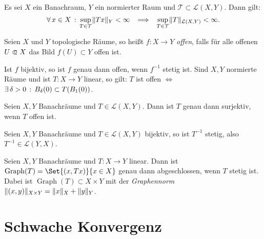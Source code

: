 \documentclass{cheat-sheet}
\newcommand{\LSO}{\mathcal{L}} %
\newcommand{\Graph}{\mathop{\mathrm{Graph}}} %
\begin{document}
\begin{satz}
  Es sei $X$ ein Banachraum, $Y$ ein normierter Raum und $\mathcal{T} \subset \LSO(X, Y)$. Dann gilt:
  \[
    \fa{x \in X} \sup_{T \in \mathcal{T}} \norm{Tx}_Y < \infty
    \enspace \implies \enspace
    \sup_{T \in \mathcal{T}} \norm{T}_{\LSO(X, Y)} < \infty.
  \]
\end{satz}

\begin{defn}
  Seien $X$ und $Y$ topologische Räume, so heißt $f : X \to Y$ \emph{offen}, falls für alle offenen $U \opn X$ das Bild $f(U) \subset Y$ offen ist.
\end{defn}

\begin{bem}
  Ist $f$ bijektiv, so ist $f$ genau dann offen, wenn $f^{-1}$ stetig ist. Sind $X, Y$ normierte Räume und ist $T : X \to Y$ linear, so gilt: $T$ ist offen $\iff$ $\exists \, {\delta > 0} \,:\, B_{\delta}(0) \subset T(B_1(0))$.
\end{bem}

\begin{satz}
  Seien $X, Y$ Banachräume und $T \in \LSO(X, Y)$. Dann ist $T$ genau dann surjektiv, wenn $T$ offen ist.
\end{satz}

\begin{samepage}

\begin{satz}
  Seien $X, Y$ Banachräume und $T \in \LSO(X, Y)$ bijektiv, so ist $T^{-1}$ stetig, also $T^{-1} \in \LSO(Y, X)$.
\end{satz}

\begin{satz}
  Seien $X, Y$ Banachräume und $T : X \to Y$ linear. Dann ist $\Graph(T) = \Set{ (x, Tx) }{ x \in X }$ genau dann abgeschlossen, wenn $T$ stetig ist. Dabei ist $\Graph(T) \subset X \times Y$ mit der \emph{Graphennorm} $\lVert(x,y)\rVert_{X \times Y} = \lVert x\rVert_X + \lVert y\rVert_Y$.
\end{satz}


\section{Schwache Konvergenz}

\end{samepage}
\end{document}
